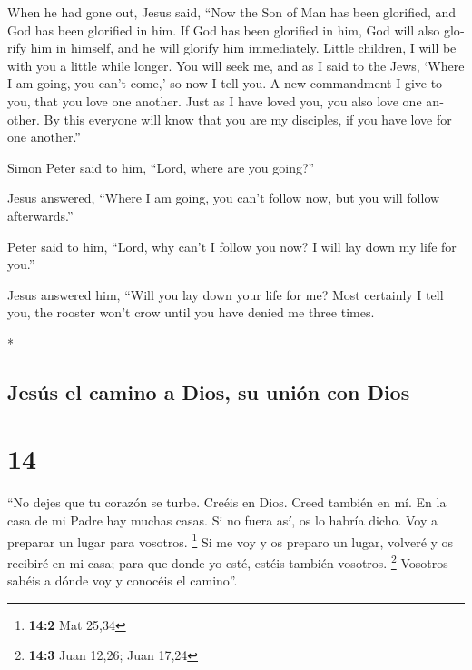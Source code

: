 \begin{paracol}{2}
\begin{otherlanguage}{english}
 When he had gone out, Jesus said, ``Now the Son of Man
has been glorified, and God has been glorified in him. 
If God has been glorified in him, God will also glorify him in himself,
and he will glorify him immediately.  Little children, I
will be with you a little while longer. You will seek me, and as I said
to the Jews, `Where I am going, you can't come,' so now I tell you.
 A new commandment I give to you, that you love one
another. Just as I have loved you, you also love one another.
 By this everyone will know that you are my disciples, if
you have love for one another.''

 Simon Peter said to him, ``Lord, where are you going?''

Jesus answered, ``Where I am going, you can't follow now, but you will
follow afterwards.''

 Peter said to him, ``Lord, why can't I follow you now? I
will lay down my life for you.''

 Jesus answered him, ``Will you lay down your life for
me? Most certainly I tell you, the rooster won't crow until you have
denied me three times.

\end{otherlanguage}

\switchcolumn[0]*

\hypertarget{jesuxfas-el-camino-a-dios-su-uniuxf3n-con-dios}{%
\subsection{Jesús el camino a Dios, su unión con
Dios}\label{jesuxfas-el-camino-a-dios-su-uniuxf3n-con-dios}}

\hypertarget{section-26}{%
\section{14}\label{section-26}}

 ``No dejes que tu corazón se turbe. Creéis en Dios. Creed
también en mí.  En la casa de mi Padre hay muchas casas.
Si no fuera así, os lo habría dicho. Voy a preparar un lugar para
vosotros. \footnote{\textbf{14:2} Mat 25,34}  Si me voy y
os preparo un lugar, volveré y os recibiré en mi casa; para que donde yo
esté, estéis también vosotros. \footnote{\textbf{14:3} Juan 12,26; Juan
  17,24}  Vosotros sabéis a dónde voy y conocéis el
camino''.


\end{paracol}
